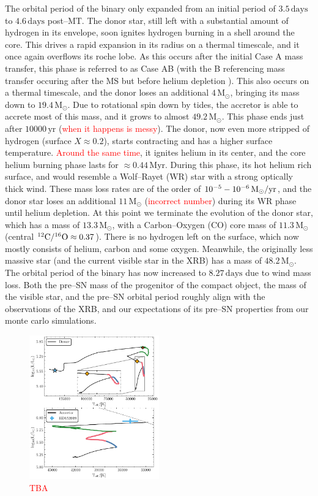 \documentclass[linenumbers,trackchanges,twocolumn]{aastex701}
\newcommand{\Mdot}{\mathrm{M}_{\odot}}
\newcommand{\red}{\textcolor{red}}
\begin{document}
The orbital period of the binary only expanded from an initial period of $3.5\,\mathrm{days}$ to $4.6\,\mathrm{days}$ post--MT. The donor star, still left with a substantial amount of hydrogen in its envelope, soon ignites hydrogen burning in a shell around the core. This drives a rapid expansion in its radius on a thermal timescale, and it once again overflows its roche lobe. As this occurs after the initial Case A mass transfer, this phase is referred to as Case AB (with the B referencing mass transfer occuring after the MS but before helium depletion \citep{1967ZA.....65..251K}). This also occurs on a thermal timescale, and the donor loses an additional $4\,\Mdot$, bringing its mass down to $19.4\,\Mdot$. Due to rotational spin down by tides, the accretor is able to accrete most of this mass, and it grows to almost $49.2\,\Mdot$. This phase ends just after $10000\, \mathrm{yr}$ (\red{when it happens is messy}).  The donor, now even more stripped of hydrogen (surface $X \approx 0.2$), starts contracting and has a higher surface temperature. \red{Around the same time}, it ignites helium in its center, and the core helium burning phase lasts for $\approx 0.44\,\mathrm{Myr}$. During this phase, its hot helium rich surface, and would resemble a Wolf--Rayet (WR) star with a strong optically thick wind. These mass loss rates are of the order of $10^{-5} - 10^{-6} \,\Mdot/\rm yr$, and the donor star loses an additional $11\,\Mdot$ (\red{incorrect number}) during its WR phase until helium depletion. At this point we terminate the evolution of the donor star, which has a mass of $13.3\,\Mdot$, with a Carbon--Oxygen (CO) core mass of $11.3\,\Mdot$ (central $\rm ^{12}C/^{16}O \approx 0.37$). There is no hydrogen left on the surface, which now mostly consists of helium, carbon and some oxygen. Meanwhile, the originally less massive star (and the current visible star in the XRB) has a mass of $48.2\,\Mdot$. The orbital period of the binary has now increased to $8.27\,\mathrm{days}$ due to wind mass loss. Both the pre--SN mass of the progenitor of the compact object, the mass of the visible star, and the pre--SN orbital period roughly align with the observations of the XRB, and our expectations of its pre--SN properties from our monte carlo simulations.

\begin{figure}[htbp]
    \centering
    \includegraphics[width=0.5\textwidth]{xrb_fiducial_hr.pdf}
    \caption{\red{TBA}}
    \label{fig:xrb_fiducial_hr}
\end{figure}
\end{document}
